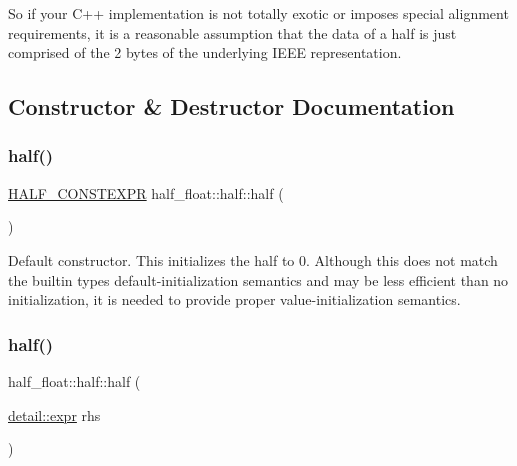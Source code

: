 So if your C++ implementation is not totally exotic or imposes special alignment requirements, it is a reasonable assumption that the data of a half is just comprised of the 2 bytes of the underlying I\+E\+EE representation. 

\subsection{Constructor \& Destructor Documentation}
\mbox{\label{classhalf__float_1_1half_a3f52e869fec499d6b86f2afc90749d6a}} 
\subsubsection{\texorpdfstring{half()}{half()}\hspace{0.1cm}{\footnotesize\ttfamily [1/3]}}
{\footnotesize\ttfamily \hyperlink{half_8hpp_ace3116a3e2cd66dd15780b92060987c7}{H\+A\+L\+F\+\_\+\+C\+O\+N\+S\+T\+E\+X\+PR} half\+\_\+float\+::half\+::half (\begin{DoxyParamCaption}{ }\end{DoxyParamCaption})\hspace{0.3cm}{\ttfamily [inline]}}

Default constructor. This initializes the half to 0. Although this does not match the builtin types\textquotesingle{} default-\/initialization semantics and may be less efficient than no initialization, it is needed to provide proper value-\/initialization semantics. \mbox{\label{classhalf__float_1_1half_ab56421622ebddd86fc75ad1eebdfbd8e}} 
\subsubsection{\texorpdfstring{half()}{half()}\hspace{0.1cm}{\footnotesize\ttfamily [2/3]}}
{\footnotesize\ttfamily half\+\_\+float\+::half\+::half (\begin{DoxyParamCaption}\item[{\hyperlink{structhalf__float_1_1detail_1_1expr}{detail\+::expr}}]{rhs }\end{DoxyParamCaption})\hspace{0.3cm}{\ttfamily [inline]}}

